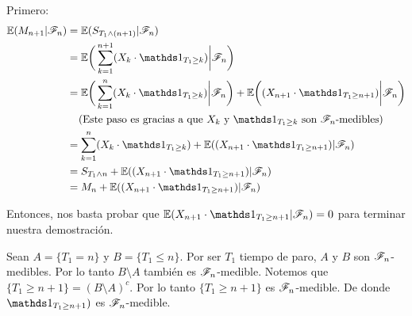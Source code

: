 \begin{itemize}
			Primero:
			\begin{align}
				\E(M_{n+1} | \F_{n})    &=  \E( S_{T_1 \wedge (n+1)} | \F_{n})                                                          \\
                                        &=  \E\bigg( \sum_{k=1}^{n+1} (X_k \cdot \indic_{T_1 \geq k})\bigg| \F_{n}\bigg)                \\	 			
                                        &=  \E\bigg( \sum_{k=1}^{n} (X_k \cdot \indic_{T_1 \geq k}) \bigg| \F_{n}\bigg) +
                                            \E\bigg((X_{n+1} \cdot \indic_{T_1 \geq n+1}) \bigg| \F_{n}\bigg)                           \\
                                        &\comment{Este paso es gracias a que $X_k$ y $\indic_{T_1 \geq k}$ son $\F_n$-medibles}  		\\
                                        &=  \sum_{k=1}^{n} (X_k \cdot \indic_{T_1 \geq k}) + 
                                            \E((X_{n+1} \cdot \indic_{T_1 \geq n+1}) | \F_{n})                                          \\
                                        &=  S_{T_1 \wedge n} + \E((X_{n+1} \cdot \indic_{T_1 \geq n+1}) | \F_{n})                       \\
                                        &=  M_n + \E((X_{n+1} \cdot \indic_{T_1 \geq n+1}) | \F_{n})
			\end{align}
			
			Entonces, nos basta probar que $\E(X_{n+1} \cdot \indic_{T_1 \geq n+1} |
			 \F_{n}) = 0$ para terminar nuestra demostración.\par\null
			 
			Sean $A = \{T_1 = n\}$ y $B = \{ T_1 \leq n\}$. Por ser $T_1$ tiempo de paro,
			$A$ y $B$ son $\mathscr{F}_n$-medibles. Por lo tanto $B \setminus A$ también es $\mathscr{F}_n$-medible. 
			Notemos que $\{T_1 \geq n+1\} = (B \setminus A)^c$. Por lo tanto $\{T_1 \geq n+1\}$ es
			$\mathscr{F}_n$-medible. De donde  $\indic_{T_1 \geq n+1})$ es $\mathscr{F}_n$-medible.\par\null
			

\end{itemize}
